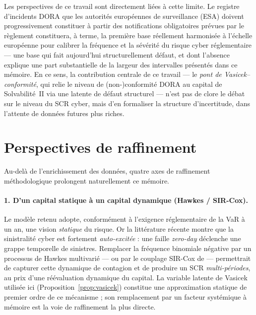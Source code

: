 \documentclass[11pt,a4paper]{article}
\theoremstyle{navystyle}
\theoremstyle{navydef}
\begin{document}
Les perspectives de ce travail sont directement liées à cette limite. Le
registre d'incidents DORA que les autorités européennes de surveillance
(ESA) doivent progressivement constituer à partir des notifications
obligatoires prévues par le règlement constituera, à terme, la première
base réellement harmonisée à l'échelle européenne pour calibrer la
fréquence et la sévérité du risque cyber réglementaire --- une base qui
fait aujourd'hui structurellement défaut, et dont l'absence explique une
part substantielle de la largeur des intervalles présentés dans ce mémoire.
En ce sens, la contribution centrale de ce travail --- le \emph{pont de
Vasicek--conformité}, qui relie le niveau de (non-)conformité DORA au capital
de Solvabilité~II via une latente de défaut structurel --- n'est pas de clore
le débat sur le niveau du SCR cyber, mais d'en formaliser la structure
d'incertitude, dans l'attente de données futures plus riches.


\vspace{1em}

\section*{Perspectives de raffinement}

Au-delà de l'enrichissement des données, quatre axes de raffinement méthodologique prolongent naturellement ce mémoire.

\paragraph{1. D'un capital statique à un capital dynamique (Hawkes / SIR-Cox).} Le modèle retenu adopte, conformément à l'exigence réglementaire de la VaR à un an, une vision \emph{statique} du risque. Or la littérature récente \citep{BessyRolandBoumezouedHillairet2021, HillairetLopezSopgoui2026} montre que la sinistralité cyber est fortement \emph{auto-excitée} : une faille \textit{zero-day} déclenche une grappe temporelle de sinistres. Remplacer la fréquence binomiale négative par un processus de Hawkes multivarié --- ou par le couplage SIR-Cox de \citet{HillairetLopezSopgoui2026} --- permettrait de capturer cette dynamique de contagion et de produire un SCR \emph{multi-périodes}, au prix d'une réévaluation dynamique du capital. La variable latente de Vasicek utilisée ici (Proposition~\ref{prop:vasicek}) constitue une approximation statique de premier ordre de ce mécanisme ; son remplacement par un facteur systémique à mémoire est la voie de raffinement la plus directe.
\end{document}

